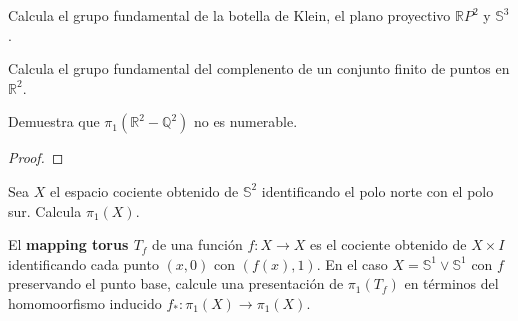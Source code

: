 \documentclass[12pt]{report}
\newcounter{it}
\theoremstyle{largebreak}
\newcommand\cf[3]{\ensuremath{#1:#2\rightarrow#3}}
\begin{document}
    \begin{sol}
        
    \end{sol}

    \begin{excer}
        Calcula el grupo fundamental de la botella de Klein, el plano proyectivo $\mathbb{R}P^2$ y $\mathbb{S}^3$.
    \end{excer}

    \begin{sol}
        
    \end{sol}

    \begin{excer}
        Calcula el grupo fundamental del complenento de un conjunto finito de puntos en $\mathbb{R}^2$.
    \end{excer}

    \begin{sol}
        
    \end{sol}

    \begin{excer}
        Demuestra que $\pi_1(\mathbb{R}^2-\mathbb{Q}^2)$ no es numerable.
    \end{excer}

    \begin{proof}
        
    \end{proof}

    \begin{excer}
        Sea $X$ el espacio cociente obtenido de $\mathbb{S}^2$ identificando el polo norte con el polo sur. Calcula $\pi_1(X)$.
    \end{excer}

    \begin{sol}
        
    \end{sol}

    \begin{excer}
        El \textbf{mapping torus $T_f$} de una función $\cf{f}{X}{X}$ es el cociente obtenido de $X\times I$ identificando cada punto $(x,0)$ con $(f(x),1)$. En el caso $X=\mathbb{S}^1\lor\mathbb{S}^1$ con $f$ preservando el punto base, calcule una presentación de $\pi_1(T_f)$ en términos del homomoorfismo inducido $\cf{f_*}{\pi_1(X)}{\pi_1(X)}$.
    \end{excer}

    \begin{sol}
        
    \end{sol}
\end{document}
